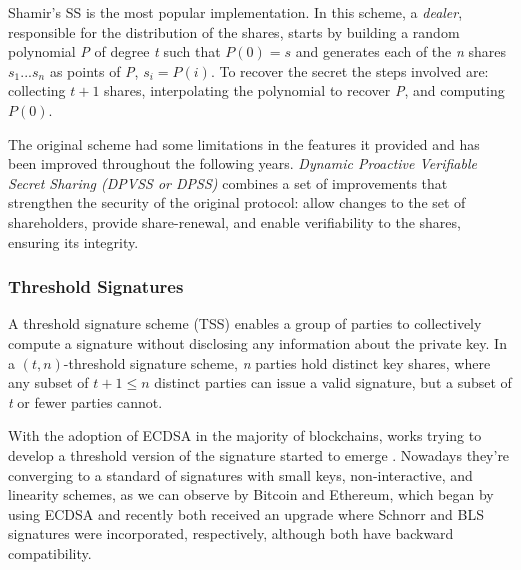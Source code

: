 \documentclass[runningheads]{llncs}
\begin{document}
Shamir's SS \cite{shamir} is the most popular implementation. In this scheme, a \textit{dealer}, responsible for the distribution of the shares, starts by building a random polynomial \textit{P} of degree \textit{t} such that $P(0) = s$ and generates each of the \textit{n} shares $s_1...s_n$ as points of \textit{P}, $s_i = P(i)$. To recover the secret the steps involved are: collecting $t + 1$ shares, interpolating the polynomial to recover \textit{P}, and computing $P(0)$.

The original scheme had some limitations in the features it provided and has been improved throughout the following years. \textit{Dynamic Proactive Verifiable Secret Sharing (DPVSS or DPSS)} combines a set of improvements that strengthen the security of the original protocol: allow changes to the set of shareholders, provide share-renewal, and enable verifiability to the shares, ensuring its integrity.

\subsubsection{Threshold Signatures} \label{subsec:threshsign}
A threshold signature scheme (TSS) enables a group of parties to collectively compute a signature without disclosing any information about the private key. In a $(t, n)$-threshold signature scheme, \textit{n} parties hold distinct key shares, where any subset of $t + 1 \le n$ distinct parties can issue a valid signature, but a subset of \textit{t} or fewer parties cannot.


With the adoption of ECDSA in the majority of blockchains, works trying to develop a threshold version of the signature started to emerge \cite{gennaro18,gennaro18}. Nowadays they're converging to a standard of signatures with small keys, non-interactive, and linearity schemes, as we can observe by Bitcoin and Ethereum, which began by using ECDSA and recently both received an upgrade where Schnorr and BLS signatures were incorporated, respectively, although both have backward compatibility.
\end{document}
